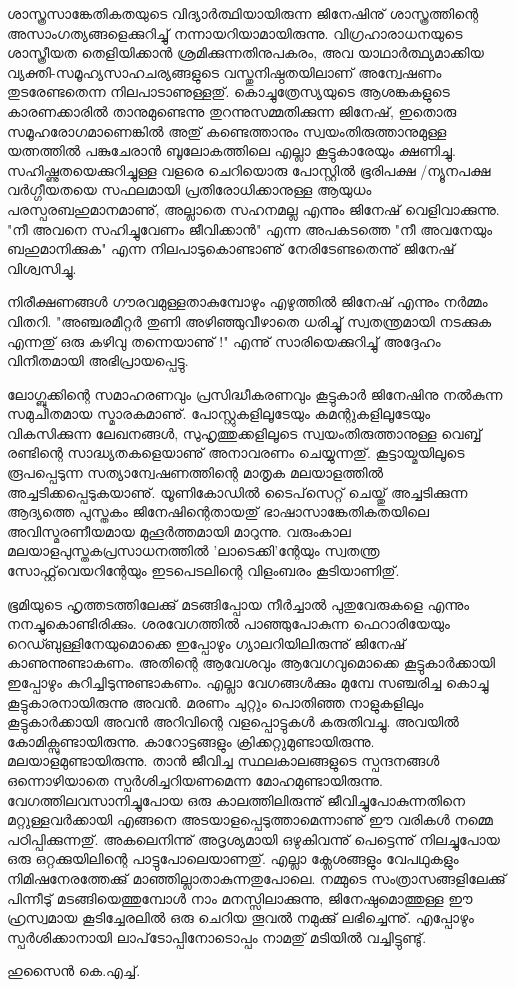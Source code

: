 ശാസ്ത്രസാങ്കേതികതയുടെ വിദ്യാര്‍ത്ഥിയായിരുന്ന ജിനേഷിനു് ശാസ്ത്രത്തിന്റെ അസാംഗത്യങ്ങളെക്കുറിച്ചു് നന്നായറിയാമായിരുന്നു. വിഗ്രഹാരാധനയുടെ ശാസ്ത്രീയത തെളിയിക്കാന്‍ ശ്രമിക്കുന്നതിനുപകരം, അവ യാഥാര്‍ത്ഥ്യമാക്കിയ വ്യക്തി-സമൂഹ്യസാഹചര്യങ്ങളുടെ വസ്തുനിഷ്ഠതയിലാണ് അന്വേഷണം തുടരേണ്ടതെന്ന നിലപാടാണുള്ളതു്. കൊച്ചുത്രേസ്യയുടെ ആശങ്കകളുടെ കാരണക്കാരില്‍ താനുമുണ്ടെന്നു തുറന്നുസമ്മതിക്കുന്ന ജിനേഷ്, ഇതൊരു സമൂഹരോഗമാണെങ്കില്‍ അതു് കണ്ടെത്താനും സ്വയംതിരുത്താനുമുള്ള യത്നത്തില്‍ പങ്കുചേരാന്‍ ബൂലോകത്തിലെ എല്ലാ കൂട്ടുകാരേയും ക്ഷണിച്ചു. സഹിഷ്ണുതയെക്കുറിച്ചുള്ള വളരെ ചെറിയൊരു പോസ്റ്റില്‍ ഭൂരിപക്ഷ /ന്യൂനപക്ഷ വര്‍ഗ്ഗീയതയെ സഫലമായി പ്രതിരോധിക്കാനുള്ള ആയുധം പരസ്പരബഹുമാനമാണു്, അല്ലാതെ സഹനമല്ല എന്നും ജിനേഷ് വെളിവാക്കുന്നു.  "നീ അവനെ സഹിച്ചുവേണം ജീവിക്കാന്‍" എന്ന അപകടത്തെ "നീ അവനേയും ബഹുമാനിക്കുക" എന്ന നിലപാടുകൊണ്ടാണു് നേരിടേണ്ടതെന്നു് ജിനേഷ് വിശ്വസിച്ചു.

നിരീക്ഷണങ്ങള്‍ ഗൗരവമുള്ളതാകുമ്പോഴും എഴുത്തില്‍ ജിനേഷ് എന്നും നര്‍മ്മം വിതറി. "അഞ്ചരമീറ്റര്‍ തുണി അഴിഞ്ഞുവീഴാതെ ധരിച്ചു് സ്വതന്ത്രമായി നടക്കുക എന്നതു് ഒരു കഴിവു തന്നെയാണു് !" എന്നു് സാരിയെക്കുറിച്ചു് അദ്ദേഹം വിനീതമായി അഭിപ്രായപ്പെട്ടു.

ലോഗ്ബുക്കിന്റെ സമാഹരണവും പ്രസിദ്ധീകരണവും കൂട്ടുകാര്‍ ജിനേഷിനു നല്‍കുന്ന സമുചിതമായ സ്മാരകമാണു്. പോസ്റ്റുകളിലൂടേയും കമന്റുകളിലൂടേയും വികസിക്കുന്ന ലേഖനങ്ങള്‍, സുഹൃത്തുക്കളിലൂടെ സ്വയംതിരുത്താനുള്ള വെബ്ബ് രണ്ടിന്റെ സാദ്ധ്യതകളെയാണു് അനാവരണം ചെയ്യുന്നതു്. കൂട്ടായ്മയിലൂടെ രൂപപ്പെടുന്ന സത്യാന്വേഷണത്തിന്റെ മാതൃക മലയാളത്തില്‍ അച്ചടിക്കപ്പെടുകയാണു്. യൂണികോഡില്‍ ടൈപ്‌സെറ്റ് ചെയ്തു് അച്ചടിക്കുന്ന ആദ്യത്തെ പുസ്തകം ജിനേഷിന്റെതായതു് ഭാഷാസാങ്കേതികതയിലെ അവിസ്മരണീയമായ മുഹൂര്‍ത്തമായി മാറുന്നു. വരുംകാല മലയാളപുസ്തകപ്രസാധനത്തില്‍ 'ലാടെക്കി'ന്റേയും സ്വതന്ത്ര സോഫ്റ്റ്‌വെയറിന്റേയും ഇടപെടലിന്റെ വിളംബരം കൂടിയാണിതു്. 

ഭൂമിയുടെ ഹൃത്തടത്തിലേക്കു് മടങ്ങിപ്പോയ നീര്‍ച്ചാല്‍ പുതുവേരുകളെ എന്നും നനച്ചുകൊണ്ടിരിക്കും. ശരവേഗത്തില്‍ പാഞ്ഞുപോകുന്ന ഫെറാരിയേയും റെഡ്ബുള്ളിനേയുമൊക്കെ ഇപ്പോഴും ഗ്യാലറിയിലിരുന്നു് ജിനേഷ് കാണുന്നുണ്ടാകണം. അതിന്റെ ആവേശവും ആവേഗവുമൊക്കെ കൂട്ടുകാര്‍ക്കായി ഇപ്പോഴും കുറിച്ചിടുന്നുണ്ടാകണം. എല്ലാ വേഗങ്ങള്‍ക്കും മുമ്പേ സഞ്ചരിച്ച കൊച്ചു കൂട്ടുകാരനായിരുന്നു അവന്‍. മരണം ചുറ്റും പൊതിഞ്ഞ നാളുകളിലും കൂട്ടുകാര്‍ക്കായി അവന്‍ അറിവിന്റെ വളപ്പൊട്ടുകള്‍ കരുതിവച്ചു. അവയില്‍ കോമിക്സുണ്ടായിരുന്നു. കാറോട്ടങ്ങളും ക്രിക്കറ്റുമുണ്ടായിരുന്നു. മലയാളമുണ്ടായിരുന്നു. താന്‍ ജീവിച്ച സ്ഥലകാലങ്ങളുടെ സ്പന്ദനങ്ങള്‍ ഒന്നൊഴിയാതെ സ്പര്‍ശിച്ചറിയണമെന്ന മോഹമുണ്ടായിരുന്നു. വേഗത്തിലവസാനിച്ചുപോയ ഒരു കാലത്തിലിരുന്നു് ജീവിച്ചുപോകുന്നതിനെ മറ്റുള്ളവര്‍ക്കായി എങ്ങനെ അടയാളപ്പെടുത്താമെന്നാണു് ഈ വരികള്‍ നമ്മെ പഠിപ്പിക്കുന്നതു്. അകലെനിന്നു് അദൃശ്യമായി ഒഴുകിവന്നു് പെട്ടെന്നു് നിലച്ചുപോയ ഒരു ഒറ്റക്കുയിലിന്റെ പാട്ടുപോലെയാണതു്. എല്ലാ ക്ലേശങ്ങളും വേപഥുകളും നിമിഷനേരത്തേക്കു് മാഞ്ഞില്ലാതാകുന്നതുപോലെ. നമ്മുടെ സംത്രാസങ്ങളിലേക്കു് പിന്നീടു് മടങ്ങിയെത്തുമ്പോള്‍ നാം മനസ്സിലാക്കുന്നു, ജിനേഷുമൊത്തുള്ള ഈ ഹ്രസ്വമായ കൂടിച്ചേരലില്‍ ഒരു ചെറിയ തൂവല്‍ നമുക്കു് ലഭിച്ചെന്നു്. എപ്പോഴും സ്പര്‍ശിക്കാനായി ലാപ്‌ടോപ്പിനോടൊപ്പം നാമതു് മടിയില്‍ വച്ചിട്ടുണ്ടു്.

\hspace*{2em}ഹുസൈന്‍ കെ.എച്ച്. 
\newpage
